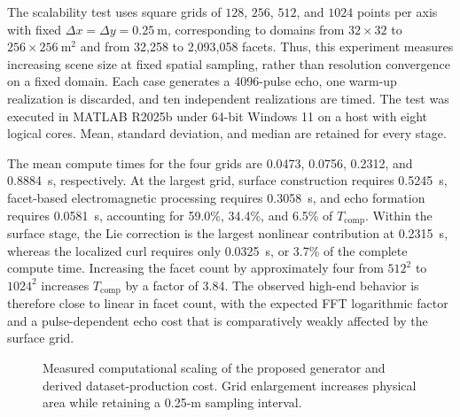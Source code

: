 The scalability test uses square grids of $128$, $256$, $512$, and $1024$ points per axis with fixed $\Delta x=\Delta y=0.25~\mathrm{m}$, corresponding to domains from $32\times32$ to $256\times256~\mathrm{m}^2$ and from 32,258 to 2,093,058 facets. Thus, this experiment measures increasing scene size at fixed spatial sampling, rather than resolution convergence on a fixed domain. Each case generates a 4096-pulse echo, one warm-up realization is discarded, and ten independent realizations are timed. The test was executed in MATLAB R2025b under 64-bit Windows 11 on a host with eight logical cores. Mean, standard deviation, and median are retained for every stage.

The mean compute times for the four grids are 0.0473, 0.0756, 0.2312, and 0.8884~s, respectively. At the largest grid, surface construction requires 0.5245~s, facet-based electromagnetic processing requires 0.3058~s, and echo formation requires 0.0581~s, accounting for 59.0\%, 34.4\%, and 6.5\% of $T_{\mathrm{comp}}$. Within the surface stage, the Lie correction is the largest nonlinear contribution at 0.2315~s, whereas the localized curl requires only 0.0325~s, or 3.7\% of the complete compute time. Increasing the facet count by approximately four from $512^2$ to $1024^2$ increases $T_{\mathrm{comp}}$ by a factor of 3.84. The observed high-end behavior is therefore close to linear in facet count, with the expected FFT logarithmic factor and a pulse-dependent echo cost that is comparatively weakly affected by the surface grid.

\begin{figure}[!t]
\centering
{}
\caption{Measured computational scaling of the proposed generator and derived dataset-production cost. Grid enlargement increases physical area while retaining a 0.25-m sampling interval.}
\label{fig:runtime_scalability}
\end{figure}

